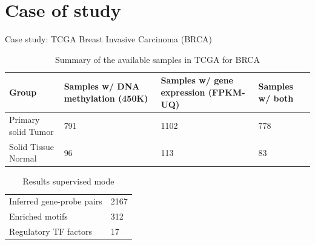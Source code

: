 \documentclass[slidestop,compress,11pt,xcolor=dvipsnames]{beamer}
\begin{document}
\section{Case of study}

\begin{frame}{Case study: TCGA Breast Invasive Carcinoma (BRCA)}
 \begin{table}[ht!]
  \centering
  \caption{Summary of the available samples in TCGA for BRCA}
  \scriptsize

  \begin{tabular}{p{2.3cm}p{2.4cm}p{2.4cm}p{1cm}}
   \toprule
   Group               & Samples w/ DNA methylation (450K) & Samples w/ gene expression (FPKM-UQ) & Samples w/ both \\ \midrule
   Primary solid Tumor & 791                               & 1102                                 & 778             \\
   Solid Tissue Normal & 96                                & 113                                  & 83              \\
   \bottomrule
  \end{tabular}
 \end{table}

 \begin{table}[ht!]
  \centering
  \caption{Results supervised mode}
  \scriptsize

  \begin{tabular}{p{2.8cm}p{2.4cm}}
   \toprule
   Inferred gene-probe pairs & 2167 \\
   Enriched motifs           & 312  \\
   Regulatory TF factors     & 17   \\
   \bottomrule
  \end{tabular}
 \end{table}
\end{frame}


\end{document}
